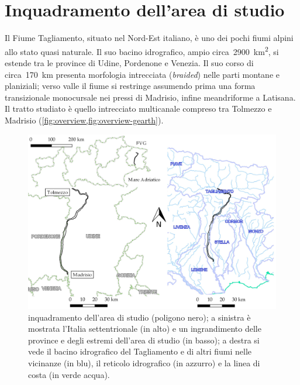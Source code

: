\section{Inquadramento dell'area di studio}
Il Fiume Tagliamento, situato nel Nord-Est italiano, è uno dei pochi fiumi alpini allo stato quasi naturale. 
Il suo bacino idrografico, ampio circa~\SI{2900}{\kilo\m\tothe{2}}, si estende tra le province di Udine, Pordenone e Venezia.
Il suo corso di circa~\SI{170}{\kilo\m} presenta morfologia intrecciata (\emph{braided}) nelle parti montane e planiziali; verso valle il fiume si restringe assumendo prima una forma transizionale monocursale nei pressi di Madrisio, infine meandriforme a Latisana.
\\
Il tratto studiato è quello intrecciato multicanale compreso tra Tolmezzo e Madrisio (\vref{fig:overview,fig:overview-gearth}).
%
\begin{figure}
	\centering
	\includegraphics[width=\textwidth]{files/overview.jpeg}
	\caption[inquadramento dell'area di studio]
		{inquadramento dell'area di studio (poligono nero); a sinistra è mostrata l'Italia settentrionale (in alto) e un ingrandimento delle province e degli estremi dell'area di studio (in basso); a destra si vede il bacino idrografico del Tagliamento e di altri fiumi nelle vicinanze (in blu), il reticolo idrografico (in azzurro) e la linea di costa (in verde acqua).}
	\label{fig:overview}
\end{figure}
%
